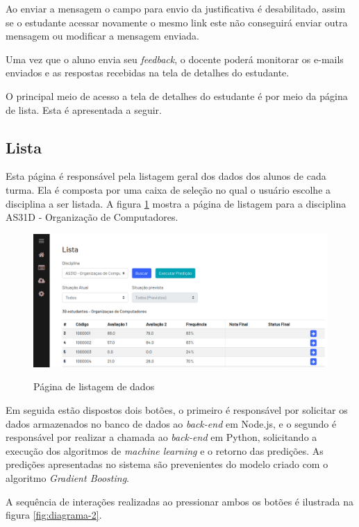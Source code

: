 Ao enviar a mensagem o campo para envio da justificativa é desabilitado, assim se o estudante acessar novamente o mesmo link este não conseguirá enviar outra mensagem ou modificar a mensagem enviada.

Uma vez que o aluno envia seu \textit{feedback}, o docente poderá monitorar os e-mails enviados e as respostas recebidas na tela de detalhes do estudante.

O principal meio de acesso a tela de detalhes do estudante é por meio da página de lista. Esta é apresentada a seguir.

\subsection{Lista}

Esta página é responsável pela listagem geral dos dados dos alunos de cada turma. 
Ela é composta por uma caixa de seleção no qual o usuário escolhe a disciplina a ser listada.
A figura \ref{fig:sistema-lista-1} mostra a página de listagem para a disciplina AS31D - Organização de Computadores.

\begin{figure}[!htb]
    \centering
    \caption{Página de listagem de dados}
    \includegraphics[width=1\textwidth]{./dados/figuras/sistema/sistema-lista-1}
    \label{fig:sistema-lista-1}
\end{figure}

Em seguida estão dispostos dois botões, o primeiro é responsável por solicitar os dados armazenados no banco de dados ao \textit{back-end} em Node.js, e o segundo é responsável por realizar a chamada ao \textit{back-end} em Python, solicitando a execução dos algoritmos de \textit{machine learning} e o retorno das predições. As predições apresentadas no sistema são prevenientes do modelo criado com o algoritmo \textit{Gradient Boosting}.

A sequência de interações realizadas ao pressionar ambos os botões é ilustrada na figura \ref{fig:diagrama-2}.

